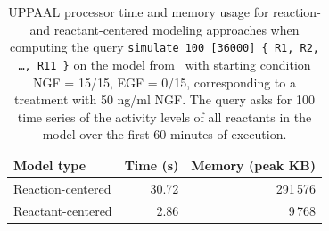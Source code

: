 \documentclass{llncs}
\begin{document}
\begin{table}
  \begin{center}
  \begin{tabular}{|l||r|r|}
    \hline
    Model type & Time (s) & Memory (peak KB) \\
    \hline
    \hline
    Reaction-centered & 30.72 & 291\,{}576 \\ %
    \hline
    Reactant-centered & 2.86 & 9\,{}768 \\ %
    \hline
  \end{tabular}
  \end{center}
  \caption{UPPAAL processor time and memory usage for reaction- and reactant-centered modeling approaches when computing
  the query {\tt simulate 100 [36000] \{ R1, R2, \dots, R11 \}} on the model from~\cite{animo-ieee} with starting condition
  NGF = 15/15, EGF = 0/15, corresponding to a treatment with 50 ng/ml NGF.
  The query asks for 100 time series of the activity levels of all reactants in the model over the first 60 minutes
  of execution.\label{tab:sim-100}}
\vspace{-1cm}
\end{table}
\end{document}
